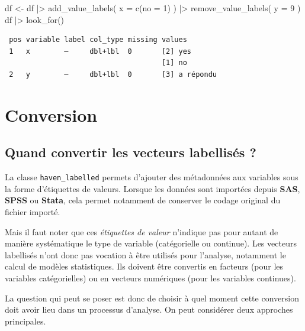 \documentclass[
  letterpaper,
  DIV=11,
  numbers=noendperiod,
  oneside]{scrreprt}
\newenvironment{Shaded}{\begin{snugshade}}{\end{snugshade}}
\newcommand{\AttributeTok}[1]{\textcolor[rgb]{0.40,0.45,0.13}{#1}}
\newcommand{\DecValTok}[1]{\textcolor[rgb]{0.68,0.00,0.00}{#1}}
\newcommand{\FunctionTok}[1]{\textcolor[rgb]{0.28,0.35,0.67}{#1}}
\newcommand{\NormalTok}[1]{\textcolor[rgb]{0.00,0.23,0.31}{#1}}
\newcommand{\OtherTok}[1]{\textcolor[rgb]{0.00,0.23,0.31}{#1}}
\newcommand{\SpecialCharTok}[1]{\textcolor[rgb]{0.37,0.37,0.37}{#1}}
\begin{document}
\begin{Shaded}
\begin{Highlighting}[]
\NormalTok{df }\OtherTok{\textless{}{-}}\NormalTok{ df }\SpecialCharTok{|\textgreater{}} 
  \FunctionTok{add\_value\_labels}\NormalTok{(}
    \AttributeTok{x =} \FunctionTok{c}\NormalTok{(}\AttributeTok{no =} \DecValTok{1}\NormalTok{)}
\NormalTok{  ) }\SpecialCharTok{|\textgreater{}} 
  \FunctionTok{remove\_value\_labels}\NormalTok{(}
    \AttributeTok{y =} \DecValTok{9}
\NormalTok{  )}
\NormalTok{df }\SpecialCharTok{|\textgreater{}} 
  \FunctionTok{look\_for}\NormalTok{()}
\end{Highlighting}
\end{Shaded}

\begin{verbatim}
 pos variable label col_type missing values       
 1   x        —     dbl+lbl  0       [2] yes      
                                     [1] no       
 2   y        —     dbl+lbl  0       [3] a répondu
\end{verbatim}

\hypertarget{conversion}{%
\section{Conversion}\label{conversion}}

\hypertarget{quand-convertir-les-vecteurs-labellisuxe9s}{%
\subsection{Quand convertir les vecteurs labellisés
?}\label{quand-convertir-les-vecteurs-labellisuxe9s}}

La classe \texttt{haven\_labelled} permets d'ajouter des métadonnées aux
variables sous la forme d'étiquettes de valeurs. Lorsque les données
sont importées depuis \textbf{SAS}, \textbf{SPSS} ou \textbf{Stata},
cela permet notamment de conserver le codage original du fichier
importé.

Mais il faut noter que ces \emph{étiquettes de valeur} n'indique pas
pour autant de manière systématique le type de variable (catégorielle ou
continue). Les vecteurs labellisés n'ont donc pas vocation à être
utilisés pour l'analyse, notamment le calcul de modèles statistiques.
Ils doivent être convertis en facteurs (pour les variables
catégorielles) ou en vecteurs numériques (pour les variables continues).

La question qui peut se poser est donc de choisir à quel moment cette
conversion doit avoir lieu dans un processus d'analyse. On peut
considérer deux approches principales.
\end{document}
